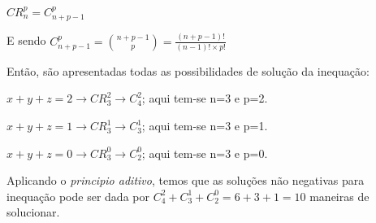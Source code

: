 \documentclass[12pt]{article}
\begin{document}
$CR_n^p = C_{n+p-1}^p$ \medskip

E sendo $\displaystyle C_{n+p-1}^p = \binom{n+p-1}{p} = \frac{(n+p-1)!}{(n-1)! \times p!}$

Então, são apresentadas todas as possibilidades de solução da inequação:

$x + y + z = 2 \rightarrow CR_3^2 \rightarrow C_4^2$; aqui tem-se n=3 e p=2.

$x + y + z = 1 \rightarrow CR_3^1 \rightarrow C_3^1$; aqui tem-se n=3 e p=1.

$x + y + z = 0 \rightarrow CR_3^0 \rightarrow C_2^0$; aqui tem-se n=3 e p=0. \medskip

Aplicando o \textit{principio aditivo}, temos que as soluções não negativas para inequação pode ser dada por $C_4^2 + C_3^1 + C_2^0 = 6 + 3 + 1 = 10$ maneiras de solucionar.
\end{document}
